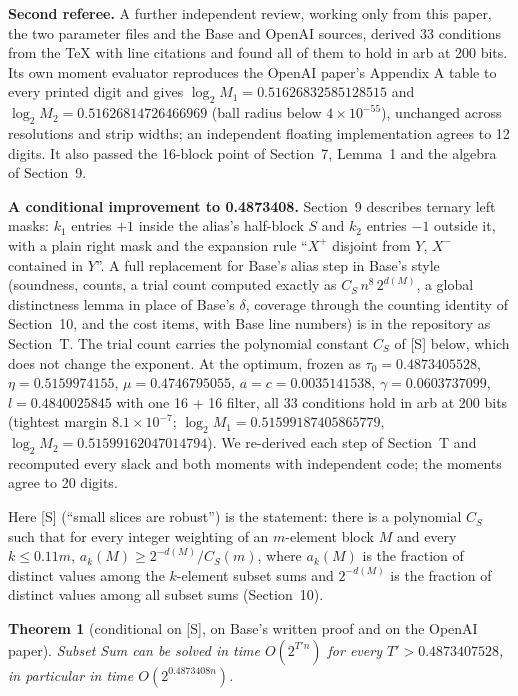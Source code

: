 \documentclass[11pt]{article}
\theoremstyle{plain}
\newtheorem*{theorem*}{Theorem}
\begin{document}
\textbf{Second referee.} A further independent review, working only from this paper, the two parameter files and the Base and OpenAI sources, derived 33 conditions from the TeX with line citations and found all of them to hold in arb at 200 bits. Its own moment evaluator reproduces the OpenAI paper's Appendix A table to every printed digit and gives $\log_2 M_1 = 0.51626832585128515$ and $\log_2 M_2 = 0.51626814726466969$ (ball radius below $4\times10^{-55}$), unchanged across resolutions and strip widths; an independent floating implementation agrees to 12 digits. It also passed the 16-block point of Section~7, Lemma~1 and the algebra of Section~9.

\textbf{A conditional improvement to 0.4873408.} Section~9 describes ternary left masks: $k_1$ entries $+1$ inside the alias's half-block $S$ and $k_2$ entries $-1$ outside it, with a plain right mask and the expansion rule ``$X^+$ disjoint from $Y$, $X^-$ contained in $Y$''. A full replacement for Base's alias step in Base's style (soundness, counts, a trial count computed exactly as $C_S\, n^8\, 2^{d(M)}$, a global distinctness lemma in place of Base's $\delta$, coverage through the counting identity of Section~10, and the cost items, with Base line numbers) is in the repository as Section~T. The trial count carries the polynomial constant $C_S$ of [S] below, which does not change the exponent. At the optimum, frozen as $\tau_0 = 0.4873405528$, $\eta = 0.5159974155$, $\mu = 0.4746795055$, $a = c = 0.0035141538$, $\gamma = 0.0603737099$, $l = 0.4840025845$ with one 16 + 16 filter, all 33 conditions hold in arb at 200 bits (tightest margin $8.1\times10^{-7}$; $\log_2 M_1 = 0.51599187405865779$, $\log_2 M_2 = 0.51599162047014794$). We re-derived each step of Section~T and recomputed every slack and both moments with independent code; the moments agree to 20 digits.

Here [S] (``small slices are robust'') is the statement: there is a polynomial $C_S$ such that for every integer weighting of an $m$-element block $M$ and every $k \le 0.11m$, $a_k(M) \ge 2^{-d(M)}/C_S(m)$, where $a_k(M)$ is the fraction of distinct values among the $k$-element subset sums and $2^{-d(M)}$ is the fraction of distinct values among all subset sums (Section~10).

\begin{theorem*}[conditional on {[S]}, on Base's written proof and on the OpenAI paper]
Subset Sum can be solved in time $O(2^{T' n})$ for every $T' > 0.4873407528$, in particular in time $O(2^{0.4873408n})$.
\end{theorem*}
\end{document}
